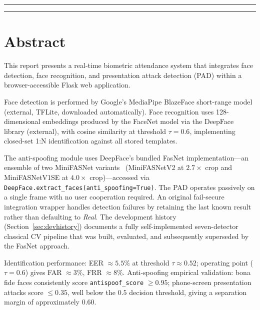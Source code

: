 \documentclass[11pt,a4paper]{article}
\begin{document}
\begin{titlepage}
\vspace{0.3cm}
\textcolor{sapblue}{\rule{\textwidth}{0.5pt}}
\vspace{0.1cm}
\textcolor{sapblue}{\rule{\textwidth}{2pt}}

\end{titlepage}

\tableofcontents
\newpage

\section*{Abstract}

This report presents a real-time biometric attendance system that integrates face
detection, face recognition, and presentation attack detection (PAD) within a
browser-accessible Flask web application.

Face detection is performed by Google's MediaPipe BlazeFace short-range model
(external, TFLite, downloaded automatically).
Face recognition uses 128-dimensional embeddings produced by the FaceNet model
via the DeepFace library (external), with cosine similarity at threshold
$\tau = 0.6$, implementing closed-set 1:N identification against all stored templates.

The anti-spoofing module uses DeepFace's bundled FasNet implementation---an ensemble
of two MiniFASNet variants~\cite{liu2021minifasnet} (MiniFASNetV2 at $2.7\times$ crop
and MiniFASNetV1SE at $4.0\times$ crop)---accessed via
\texttt{DeepFace.extract\_faces(anti\_spoofing=True)}.
The PAD operates passively on a single frame with no user cooperation required.
An original fail-secure integration wrapper handles detection failures by retaining
the last known result rather than defaulting to \textit{Real}.
The development history (Section~\ref{sec:devhistory}) documents a fully
self-implemented seven-detector classical CV pipeline that was built, evaluated,
and subsequently superseded by the FasNet approach.

Identification performance: EER $\approx 5.5\%$ at threshold $\tau \approx 0.52$;
operating point ($\tau = 0.6$) gives FAR $\approx 3\%$, FRR $\approx 8\%$.
Anti-spoofing empirical validation: bona fide faces consistently score
\texttt{antispoof\_score} $\geq 0.95$; phone-screen presentation attacks score
$\leq 0.35$, well below the $0.5$ decision threshold, giving a separation margin
of approximately $0.60$.
\end{document}
